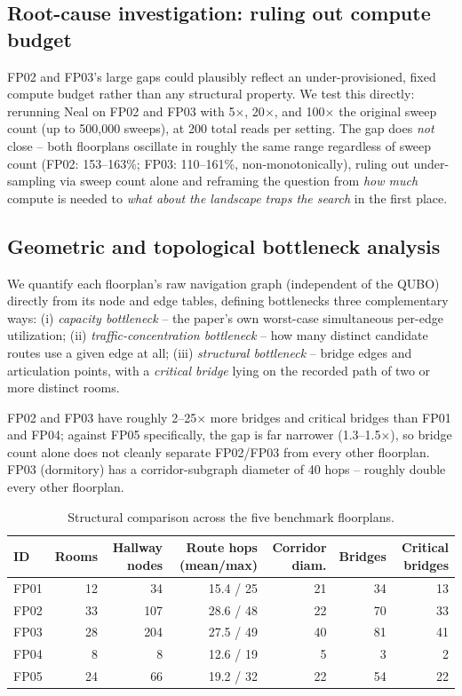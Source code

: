 \documentclass[11pt]{article}
\begin{document}
\subsection{Root-cause investigation: ruling out compute budget}
\label{sec:budget}
FP02 and FP03's large gaps could plausibly reflect an under-provisioned, fixed compute budget rather than any structural property. We test this directly: rerunning Neal on FP02 and FP03 with 5$\times$, 20$\times$, and 100$\times$ the original sweep count (up to 500,000 sweeps), at 200 total reads per setting. The gap does \emph{not} close -- both floorplans oscillate in roughly the same range regardless of sweep count (FP02: 153--163\%; FP03: 110--161\%, non-monotonically), ruling out under-sampling via sweep count alone and reframing the question from \emph{how much} compute is needed to \emph{what about the landscape traps the search} in the first place.

\subsection{Geometric and topological bottleneck analysis}
\label{sec:geometry}
We quantify each floorplan's raw navigation graph (independent of the QUBO) directly from its node and edge tables, defining bottlenecks three complementary ways: (i) \textit{capacity bottleneck} -- the paper's own worst-case simultaneous per-edge utilization; (ii) \textit{traffic-concentration bottleneck} -- how many distinct candidate routes use a given edge at all; (iii) \textit{structural bottleneck} -- bridge edges and articulation points, with a \textit{critical bridge} lying on the recorded path of two or more distinct rooms.

FP02 and FP03 have roughly 2--25$\times$ more bridges and critical bridges than FP01 and FP04; against FP05 specifically, the gap is far narrower (1.3--1.5$\times$), so bridge count alone does not cleanly separate FP02/FP03 from every other floorplan. FP03 (dormitory) has a corridor-subgraph diameter of 40 hops -- roughly double every other floorplan.

\begin{table}[h]
\centering
\caption{Structural comparison across the five benchmark floorplans.}
\label{tab:geometry}
\small
\begin{tabular}{lrrrrrr}
\toprule
ID & Rooms & Hallway nodes & Route hops (mean/max) & Corridor diam. & Bridges & Critical bridges \\
\midrule
FP01 & 12 & 34 & 15.4 / 25 & 21 & 34 & 13 \\
FP02 & 33 & 107 & 28.6 / 48 & 22 & 70 & 33 \\
FP03 & 28 & 204 & 27.5 / 49 & 40 & 81 & 41 \\
FP04 & 8 & 8 & 12.6 / 19 & 5 & 3 & 2 \\
FP05 & 24 & 66 & 19.2 / 32 & 22 & 54 & 22 \\
\bottomrule
\end{tabular}
\end{table}
\end{document}
